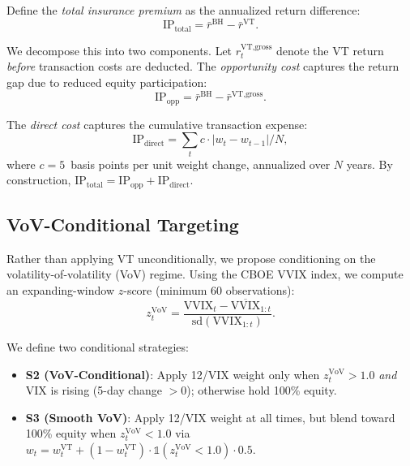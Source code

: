 \documentclass[12pt,a4paper]{article}
\begin{document}
Define the \emph{total insurance premium} as the annualized return difference:
\begin{equation}
\text{IP}_{\text{total}} = \bar{r}^{\text{BH}} - \bar{r}^{\text{VT}}.
\label{eq:ip_total}
\end{equation}

We decompose this into two components. Let $r_t^{\text{VT,gross}}$ denote the VT return \emph{before} transaction costs are deducted. The \emph{opportunity cost} captures the return gap due to reduced equity participation:
\begin{equation}
\text{IP}_{\text{opp}} = \bar{r}^{\text{BH}} - \bar{r}^{\text{VT,gross}}.
\label{eq:ip_opp}
\end{equation}

The \emph{direct cost} captures the cumulative transaction expense:
\begin{equation}
\text{IP}_{\text{direct}} = \sum_{t} c \cdot |w_t - w_{t-1}| / N,
\label{eq:ip_direct}
\end{equation}
where $c = 5$~basis points per unit weight change, annualized over $N$ years. By construction, $\text{IP}_{\text{total}} = \text{IP}_{\text{opp}} + \text{IP}_{\text{direct}}$.

\subsection{VoV-Conditional Targeting}

Rather than applying VT unconditionally, we propose conditioning on the volatility-of-volatility (VoV) regime. Using the CBOE VVIX index, we compute an expanding-window $z$-score (minimum 60 observations):
\begin{equation}
z_t^{\text{VoV}} = \frac{\text{VVIX}_t - \overline{\text{VVIX}}_{1:t}}{\text{sd}(\text{VVIX}_{1:t})}.
\end{equation}

We define two conditional strategies:
\begin{itemize}
\item \textbf{S2 (VoV-Conditional)}: Apply 12/VIX weight only when $z_t^{\text{VoV}} > 1.0$ \emph{and} VIX is rising (5-day change $ > 0$); otherwise hold 100\% equity.
\item \textbf{S3 (Smooth VoV)}: Apply 12/VIX weight at all times, but blend toward 100\% equity when $z_t^{\text{VoV}} < 1.0$ via $w_t = w_t^{\text{VT}} + (1 - w_t^{\text{VT}}) \cdot \mathbb{1}(z_t^{\text{VoV}} < 1.0) \cdot 0.5$.
\end{itemize}
\end{document}
